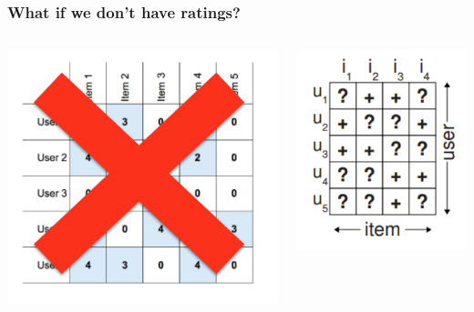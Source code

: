 \documentclass[11pt]{beamer}
\begin{document}
	\begin{frame}
		\frametitle{What if we don't have ratings?}
		\begin{columns}
			\begin{column}{0.5\textwidth}
				\begin{center}
					\centering
					\includegraphics[width=\textwidth]{images/no-rating.png}
				\end{center}
			\end{column}
			\begin{column}{0.5\textwidth}
				\begin{center}
					\centering
					\includegraphics[width=\textwidth]{images/implicit.png}
					

\end{center}
\end{column}
\end{columns}
\end{frame}
\end{document}
